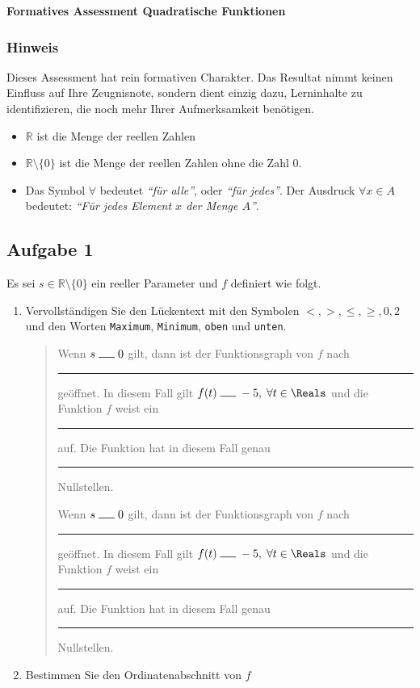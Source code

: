 \documentclass[12pt]{article}
\begin{document}
\begin{center}
\Large \textbf{Formatives Assessment Quadratische Funktionen}\\[1em]
\footnotesize
\end{center}
{\footnotesize
\subsubsection*{Hinweis}
Dieses Assessment hat rein formativen Charakter. Das Resultat nimmt keinen Einfluss auf Ihre Zeugnisnote, sondern dient einzig dazu, Lerninhalte zu identifizieren, die noch mehr Ihrer Aufmerksamkeit benötigen.
\begin{itemize}
\item $\mathbb{R}$ ist die Menge der reellen Zahlen
\item $\mathbb{R} \setminus \{0\}$ ist die Menge der reellen Zahlen ohne die Zahl $0$.
\item Das Symbol $\forall$ bedeutet \emph{``für alle''}, oder \emph{``für jedes''}. Der Ausdruck $\forall x \in A$ bedeutet: \emph{``Für jedes Element $x$ der Menge $A$''}.
\end{itemize}
}
\subsection*{Aufgabe 1}

Es sei $s \in \mathbb{R} \setminus \{0\}$ ein reeller Parameter und $f$ definiert wie folgt. 
\begin{enumerate}[label=\alph*)]
\item Vervollständigen Sie den Lückentext mit den Symbolen $<,>, \leqslant, \geqslant,0,2$ und den Worten \texttt{Maximum}, \texttt{Minimum}, \texttt{oben} und \texttt{unten}.
\begin{quote} \doublespacing
Wenn $s \; \rule{0.5cm}{0.5pt} \; 0$ gilt, dann ist der Funktionsgraph von $f$ nach \rule{2cm}{0.5pt} geöffnet. In diesem Fall gilt $f(t)\; \rule{0.5cm}{0.5pt} \; -5, \; \forall t \in \Reals$ und die Funktion $f$ weist ein \rule{2cm}{0.5pt} auf. Die Funktion hat in diesem Fall genau \rule{0.5cm}{0.5pt} Nullstellen.


Wenn $s \; \rule{0.5cm}{0.5pt} \; 0$ gilt, dann ist der Funktionsgraph von $f$ nach \rule{2cm}{0.5pt} geöffnet. In diesem Fall gilt $f(t)\; \rule{0.5cm}{0.5pt} \; -5, \; \forall t \in \Reals$ und die Funktion $f$ weist ein \rule{2cm}{0.5pt} auf. Die Funktion hat in diesem Fall genau \rule{0.5cm}{0.5pt} Nullstellen.
\end{quote}
\item Bestimmen Sie den Ordinatenabschnitt von $f$
\end{enumerate}
\end{document}
